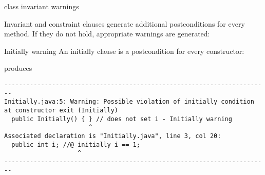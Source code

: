 \documentclass[
pdf,
nocolorBG,
slideColor,
cok,
]{prosper}
\begin{document}
\begin{slide}{class invariant warnings}

\vspace*{-6ex}
Invariant and constraint clauses generate additional postconditions for every method.
If they do not hold, appropriate warnings are generated:

\begin{figure*}
\tiny

\end{figure*}
\end{slide}
\begin{slide}{Initially warning}
\vspace*{-6ex}
An initially clause is a postcondition for every constructor:

\begin{figure*}
\tiny

\end{figure*}
produces
\tiny
\begin{verbatim}
------------------------------------------------------------------------
Initially.java:5: Warning: Possible violation of initially condition 
at constructor exit (Initially)
  public Initially() { } // does not set i - Initially warning
                       ^
Associated declaration is "Initially.java", line 3, col 20:
  public int i; //@ initially i == 1;
                    ^
------------------------------------------------------------------------
\end{verbatim}
\end{slide}
\end{document}
